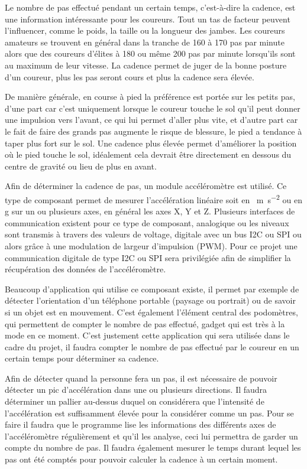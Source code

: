 Le nombre de pas effectué pendant un certain temps, c’est-à-dire la cadence, est une information intéressante pour les coureurs. Tout un tas de facteur peuvent l’influencer, comme le poids, la taille ou la longueur des jambes. Les coureurs amateurs se trouvent en général dans la tranche de 160 à 170 pas par minute alors que des coureurs d’élites à 180 ou même 200 pas par minute lorsqu’ils sont au maximum de leur vitesse. La cadence permet de juger de la bonne posture d’un coureur, plus les pas seront cours et plus la cadence sera élevée. 

De manière générale, en course à pied la préférence est portée sur les petits pas, d’une part car c’est uniquement lorsque le coureur touche le sol qu’il peut donner une impulsion vers l’avant, ce qui lui permet d’aller plus vite, et d’autre part car le fait de faire des grands pas augmente le risque de blessure, le pied a tendance à taper plus fort sur le sol. Une cadence plus élevée permet d’améliorer la position où le pied touche le sol, idéalement cela devrait être directement en dessous du centre de gravité ou lieu de plus en avant.

Afin de déterminer la cadence de pas, un module accéléromètre est utilisé. Ce type de composant permet de mesurer l’accélération linéaire soit en \SI{}{\m\per\square\s} ou en g sur un ou plusieurs axes, en général les axes X, Y et Z. Plusieurs interfaces de communication existent pour ce type de composant, analogique ou les niveaux sont transmis à travers des valeurs de voltage, digitale avec un bus I2C ou SPI ou alors grâce à une modulation de largeur d’impulsion (PWM). Pour ce projet une communication digitale de type I2C ou SPI sera privilégiée afin de simplifier la récupération des données de l’accéléromètre.

Beaucoup d’application qui utilise ce composant existe, il permet par exemple de détecter l’orientation d’un téléphone portable (paysage ou portrait) ou de savoir si un objet est en mouvement. C’est également l’élément central des podomètres, qui permettent de compter le nombre de pas effectué, gadget qui est très à la mode en ce moment. C’est justement cette application qui sera utilisée dans le cadre du projet, il faudra compter le nombre de pas effectué par le coureur en un certain temps pour déterminer sa cadence.

Afin de détecter quand la personne fera un pas, il est nécessaire de pouvoir détecter un pic d’accélération dans une ou plusieurs directions. Il faudra déterminer un pallier au-dessus duquel on considérera que l’intensité de l’accélération est suffisamment élevée pour la considérer comme un pas. Pour se faire il faudra que le programme lise les informations des différents axes de l’accéléromètre régulièrement et qu’il les analyse, ceci lui permettra de garder un compte du nombre de pas. Il faudra également mesurer le temps durant lequel les pas ont été comptés pour pouvoir calculer la cadence à un certain moment. 

